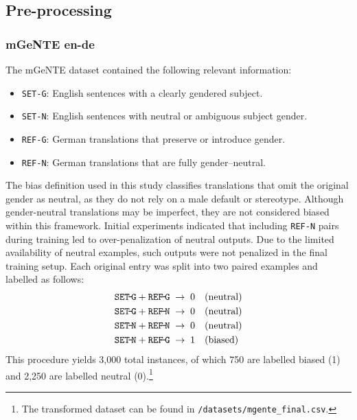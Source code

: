 \subsection{Pre-processing}

\subsubsection{mGeNTE en-de} 
The mGeNTE dataset contained the following relevant information:  

\begin{itemize}  
  \item \texttt{SET-G}: English sentences with a clearly gendered subject.  
  \item \texttt{SET-N}: English sentences with neutral or ambiguous subject gender.  
  \item \texttt{REF-G}: German translations that preserve or introduce gender.  
  \item \texttt{REF-N}: German translations that are fully gender–neutral.  
\end{itemize}  

\noindent
The bias definition used in this study classifies translations that omit the original gender as neutral, as they do not rely on a male default or stereotype. Although gender-neutral translations may be imperfect, they are not considered biased within this framework. Initial experiments indicated that including \texttt{REF-N} pairs during training led to over-penalization of neutral outputs. Due to the limited availability of neutral examples, such outputs were not penalized in the final training setup. Each original entry was split into two paired examples and labelled as follows:  
\[
\begin{aligned}
\texttt{SET\!-\!G} + \texttt{REF\!-\!G} &\;\rightarrow\; 0 \quad(\text{neutral})\\
\texttt{SET\!-\!G} + \texttt{REF\!-\!N} &\;\rightarrow\; 0 \quad(\text{neutral})\\
\texttt{SET\!-\!N} + \texttt{REF\!-\!N} &\;\rightarrow\; 0 \quad(\text{neutral})\\
\texttt{SET\!-\!N} + \texttt{REF\!-\!G} &\;\rightarrow\; 1 \quad(\text{biased})
\end{aligned}
\]  
This procedure yields 3,000 total instances, of which 750 are labelled biased (1) and 2,250 are labelled neutral (0).\footnote{The transformed dataset can be found in \texttt{/datasets/mgente\_final.csv}.} 

